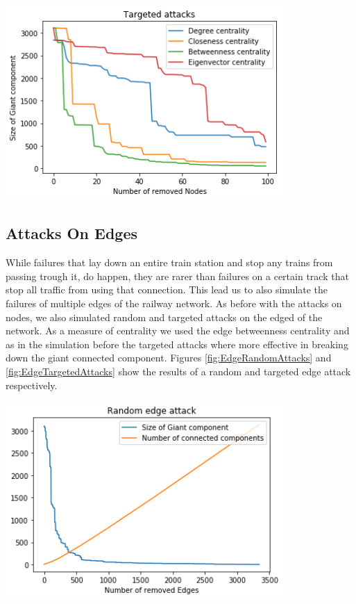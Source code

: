 \documentclass{Resources/netsci-project}
\begin{document}
\begin{center}
    \centering
    \includegraphics[width=300pt]{Resources/node_targeted_attacks}
    \label{fig:NodeTargetedAttacks}
\end{center}

\subsection{Attacks On Edges}
While failures that lay down an entire train station and stop any trains from passing trough it, do happen, they are rarer than failures on a certain track that stop all traffic from using that connection. This lead us to also simulate the failures of multiple edges of the railway network. As before with the attacks on nodes, we also simulated random and targeted attacks on the edged of the network. As a measure of centrality we used the edge betweenness centrality and as in the simulation before the targeted attacks where more effective in breaking down the giant connected component. Figures \ref{fig:EdgeRandomAttacks} and \ref{fig:EdgeTargetedAttacks} show the results of a random and targeted edge attack respectively.

\begin{center}
    \centering
    \includegraphics[width=300pt]{Resources/edge_random_attacks}
    \label{fig:EdgeRandomAttacks}
\end{center}
\end{document}
